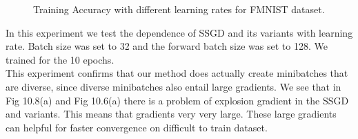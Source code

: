 \documentclass[a4paper,twoside]{iiththesis}
\theoremstyle{definition}
\theoremstyle{definition}
\theoremstyle{remark}
\begin{document}
\begin{figure}
    \caption{Training Accuracy with different learning rates for FMNIST dataset.}
    \label{fig:Learning Rate Acc}
\end{figure}
In this experiment we test the dependence of SSGD and its variants  with learning rate. Batch size was set to 32 and the forward batch size was set to 128. We trained for the 10 epochs.
\\
This experiment confirms that our method does actually create minibatches that are diverse, since diverse minibatches also entail large gradients. We see that in Fig 10.8(a) and Fig 10.6(a) there is a problem of explosion gradient in the SSGD and variants. This means that gradients very very large. These large gradients can helpful for faster convergence on difficult to train dataset.
\newpage
\end{document}
